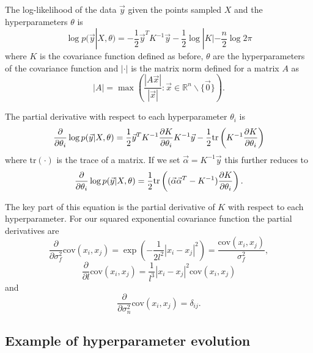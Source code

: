 \documentclass[phd,tocprelim]{cornell}
\begin{document}
The log-likelihood of the data $\vec{y}$ given the points sampled $X$ and the hyperparameters $\theta$ is
\begin{equation}
    \log p(\vec{y}|X, \theta) = -\frac{1}{2}\vec{y}^{T}K^{-1}\vec{y} - \frac{1}{2}\log|K| - \frac{n}{2} \log 2\pi
\end{equation}
where $K$ is the covariance function defined as before, $\theta$ are the hyperparameters of the covariance function and $|\cdot|$ is the matrix norm defined for a matrix $A$ as
\begin{equation}
    |A| = \max \left( \frac{|A\vec{x}|}{|\vec{x}|} : \vec{x} \in \mathbb{R}^{n}\backslash\{\vec{0}\} \right).
\end{equation}

The partial derivative with respect to each hyperparameter $\theta_{i}$ is
\begin{equation}
    \frac{\partial}{\partial \theta_{i}} \log p(\vec{y}|X,\theta) = \frac{1}{2}\vec{y}^{T}K^{-1}\frac{\partial K}{\partial \theta_{i}} K^{-1}\vec{y} - \frac{1}{2} {\rm tr}\left( K^{-1}\frac{\partial K}{\partial \theta_{i}} \right)
\end{equation}
where tr$(\cdot)$ is the trace of a matrix. If we set $\vec{\alpha} = K^{-1}\vec{y}$ this further reduces to
\begin{equation}
    \frac{\partial}{\partial \theta_{i}} \log p(\vec{y}|X,\theta) = \frac{1}{2} {\rm tr}\left((\vec{\alpha}\vec{\alpha}^{T} - K^{-1})\frac{\partial K}{\partial \theta_{i}}\right).
\end{equation}

The key part of this equation is the partial derivative of $K$ with respect to each hyperparameter. For our squared exponential covariance function the partial derivatives are
\begin{equation}
    \frac{\partial}{\partial \sigma_{f}^{2}} \mbox{cov}(x_{i}, x_{j}) = \exp\left( -\frac{1}{2l^{2}} |x_{i} - x_{j}|^{2}\right) = \frac{\mbox{cov}(x_{i}, x_{j})}{\sigma_{f}^{2}},
\end{equation}
\begin{equation}
    \frac{\partial}{\partial l} \mbox{cov}(x_{i}, x_{j}) = \frac{1}{l^{3}}|x_{i} - x_{j}|^{2}\mbox{cov}(x_{i}, x_{j})
\end{equation}
and
\begin{equation}
    \frac{\partial}{\partial \sigma_{n}^{2}} \mbox{cov}(x_{i}, x_{j}) = \delta_{ij}.
\end{equation}

\subsection{Example of hyperparameter evolution}
\end{document}
